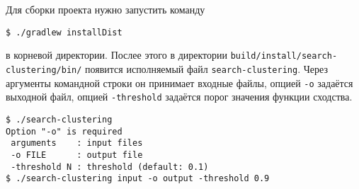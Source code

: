 \documentclass{article}
\begin{document}
Для сборки проекта нужно запустить команду
\begin{verbatim}
$ ./gradlew installDist
\end{verbatim}
в корневой директории.
Послее этого в директории \texttt{build/install/search-clustering/bin/} появится исполняемый файл \texttt{search-clustering}.
Через аргументы командной строки он принимает входные файлы,
опцией \texttt{-o} задаётся выходной файл,
опцией \texttt{-threshold} задаётся порог значения функции сходства.
\begin{verbatim}
$ ./search-clustering                                                          
Option "-o" is required
 arguments    : input files
 -o FILE      : output file
 -threshold N : threshold (default: 0.1)
$ ./search-clustering input -o output -threshold 0.9
\end{verbatim}
\end{document}

